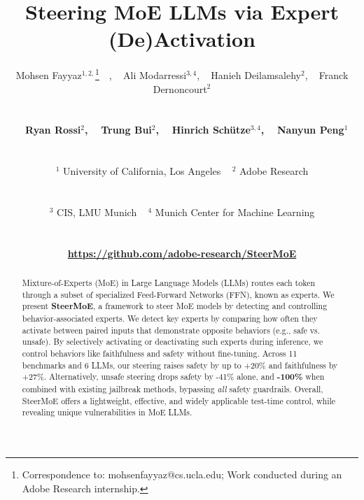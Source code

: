 \documentclass{article} %
\title{Steering MoE LLMs via Expert (De)Activation}
\author{
\centerline{
Mohsen Fayyaz$^{1,2,}$\thanks{Correspondence to: mohsenfayyaz@cs.ucla.edu; Work conducted during an Adobe Research internship.}~~, ~ Ali Modarressi$^{3,4}$, ~ Hanieh Deilamsalehy$^{2}$, ~ Franck Dernoncourt$^{2}$ 
}\\ 
\centerline{
\textbf{~ Ryan Rossi$^{2}$, ~ Trung Bui$^{2}$, ~ Hinrich Schütze$^{3,4}$, ~ Nanyun Peng$^{1}$}
}\\
\centerline{$^1$ University of California, Los Angeles ~ $^2$ Adobe Research} \\ 
\centerline{$^3$ CIS, LMU Munich ~ $^4$ Munich Center for Machine Learning} \\
\centerline{\textbf{\url{https://github.com/adobe-research/SteerMoE}}}
}
\newcommand{\safe}{+20\%}
\newcommand{\unsafe}{-41\%}
\newcommand{\unsafejail}{-100\%}
\newcommand{\faithfulness}{+27\%}
\begin{document}
\maketitle

\begin{abstract}
Mixture-of-Experts (MoE) in Large Language Models (LLMs) routes each token through a subset of specialized Feed-Forward Networks (FFN), known as experts.
We present \textbf{SteerMoE}, a framework to steer MoE models by detecting and controlling behavior-associated experts.
We detect key experts by comparing how often they activate between paired inputs that demonstrate opposite behaviors (e.g., safe vs. unsafe).
By selectively activating or deactivating such experts during inference, we control behaviors like faithfulness and safety without fine-tuning.
Across 11 benchmarks and 6 LLMs, our steering raises safety by up to \safe{} and faithfulness by \faithfulness{}. Alternatively, unsafe steering drops safety by \unsafe{} alone, and \textbf{\unsafejail{}} when combined with existing jailbreak methods, bypassing \emph{all} safety guardrails.
Overall, SteerMoE offers a lightweight, effective, and widely applicable test-time control, while revealing unique vulnerabilities in MoE LLMs.





\end{abstract}


\end{document}
